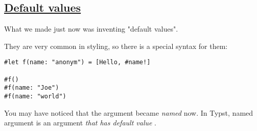 \pandocbounded{}

\subsection{\texorpdfstring{\hyperref[default-values]{Default
values}}{Default values}}\label{default-values}

What we made just now was inventing "default values".

They are very common in styling, so there is a special syntax for them:

\begin{verbatim}
#let f(name: "anonym") = [Hello, #name!]

#f()
#f(name: "Joe")
#f(name: "world")
\end{verbatim}

\pandocbounded{}

You may have noticed that the argument became \emph{named} now. In
Typst, named argument is an argument \emph{that has default value} .
